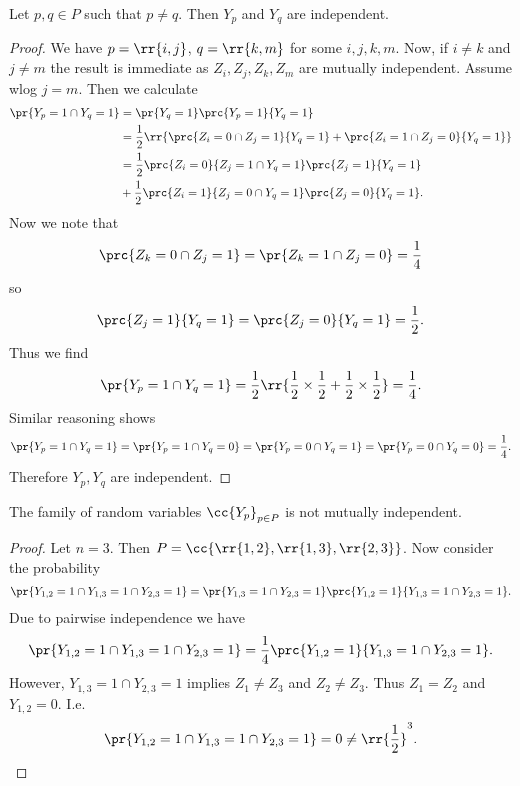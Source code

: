 \documentclass{article}
\begin{document}
\begin{claim*}[c]
  Let $p,q\in P$ such that $p\neq q$. Then $Y_p$ and $Y_q$ are independent.
  \begin{proof}
    We have $p=\rr{i,j}$, $q=\rr{k,m}$ for some $i,j,k,m$. Now, if $i\neq k$
    and $j\neq m$ the result is immediate as $Z_i,Z_j,Z_k,Z_m$ are mutually independent.
    Assume wlog $j=m$. Then we calculate
    \begin{align*}
      \pr{Y_p=1 \cap Y_q=1}&=\pr{Y_q=1}\prc{Y_p=1}{Y_q=1} \\
                           & = \frac{1}{2}\rr{\prc{Z_i=0\cap Z_j=1}{Y_q=1} + \prc{Z_i=1\cap Z_j=0}{Y_q=1}} \\
                           & = \frac{1}{2}\prc{Z_i=0}{Z_j=1\cap Y_q=1}\prc{Z_j=1}{Y_q=1} \\
                           & + \frac{1}{2}\prc{Z_i=1}{Z_j=0\cap Y_q=1}\prc{Z_j=0}{Y_q=1}. \\
    \end{align*}
    Now we note that
    \begin{align*}
      \prc{Z_k=0\cap Z_j=1}=\pr{Z_k=1\cap Z_j=0} = \frac{1}{4}
    \end{align*}
    so
    \begin{align*}
      \prc{Z_j=1}{Y_q=1}=\prc{Z_j=0}{Y_q=1} = \frac{1}{2}.
    \end{align*}
    Thus we find
    \begin{align*}
      \pr{Y_p=1\cap Y_q=1}=\frac{1}{2}\rr{\frac{1}{2}\times \frac{1}{2} + \frac{1}{2}\times\frac{1}{2}} = \frac{1}{4}.
    \end{align*}
    Similar reasoning shows
    \begin{align*}
      \pr{Y_p=1\cap Y_q=1}
      =\pr{Y_p=1\cap Y_q=0}
      =\pr{Y_p=0\cap Y_q=1}
      =\pr{Y_p=0\cap Y_q=0}
      =\frac{1}{4}.
    \end{align*}
    Therefore $Y_p,Y_q$ are independent.
  \end{proof}
\end{claim*}

\begin{claim*}[d]
  The family of random variables $\cc{Y_p}_{p\in P}$ is not mutually independent.
  \begin{proof}
    Let $n=3$. Then $P=\cc{\rr{1,2},\rr{1,3},\rr{2,3}}$. Now consider the probability
    \begin{align*}
      \pr{Y_{1,2}=1\cap Y_{1,3}=1\cap Y_{2,3}=1} = \pr{Y_{1,3}=1\cap Y_{2,3}=1}\prc{Y_{1,2}=1}{Y_{1,3}=1\cap Y_{2,3}=1}.
    \end{align*}
    Due to pairwise independence we have
    \begin{align*}
      \pr{Y_{1,2}=1\cap Y_{1,3}=1\cap Y_{2,3}=1} = \frac{1}{4}\prc{Y_{1,2}=1}{Y_{1,3}=1\cap Y_{2,3}=1}.
    \end{align*}
    However, $Y_{1,3}=1\cap Y_{2,3}=1$ implies $Z_1\neq Z_3$ and $Z_2\neq Z_3$. Thus $Z_1=Z_2$ and
    $Y_{1,2}=0$. I.e.
    \begin{align*}
      \pr{Y_{1,2}=1\cap Y_{1,3}=1\cap Y_{2,3}=1} = 0 \neq \rr{\frac{1}{2}}^3.
    \end{align*}
  \end{proof}
\end{claim*}
\end{document}
